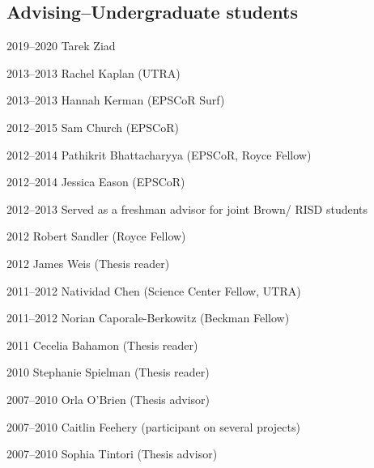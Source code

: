 \subsection*{Advising--Undergraduate students}

\begin{entry}{60pt}
\item [\rm 2019--2020] Tarek Ziad
\item [\rm 2013--2013] Rachel  Kaplan (UTRA)
\item [\rm 2013--2013] Hannah Kerman (EPSCoR Surf)
\item [\rm 2012--2015] Sam Church (EPSCoR)
\item [\rm 2012--2014] Pathikrit Bhattacharyya (EPSCoR, Royce Fellow)
\item [\rm 2012--2014] Jessica Eason (EPSCoR)
\item [\rm 2012--2013] Served as a freshman advisor for joint Brown/ RISD students
\item [\rm 2012] Robert Sandler (Royce Fellow)
\item [\rm 2012] James Weis (Thesis reader)
\item [\rm 2011--2012] Natividad Chen (Science Center Fellow, UTRA)
\item [\rm 2011--2012] Norian Caporale-Berkowitz (Beckman Fellow)
\item [\rm 2011] Cecelia Bahamon (Thesis reader)
\item [\rm 2010] Stephanie Spielman (Thesis reader)
\item [\rm 2007--2010] Orla O'Brien (Thesis advisor)
\item [\rm 2007--2010] Caitlin Feehery (participant on several projects)
\item [\rm 2007--2010] Sophia Tintori (Thesis advisor)

\end{entry}
